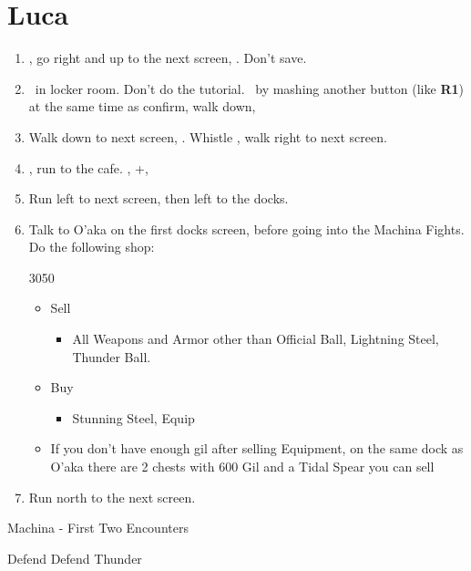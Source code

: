 \chapter{Luca}

\begin{enumerate}
    \item \sd, go right and up to the next screen, \cs[2:30]. Don't save.
    \item \sd\ in locker room. Don't do the tutorial. \sd\ by mashing another button (like \textbf{R1}) at the same time as confirm, walk down, \sd
    \item Walk down to next screen, \sd. Whistle \cs[0:30], walk right to next screen.
    \item \sd, run to the cafe. \sd, \skippablefmv+\cs[1:20], \sd
    \item Run left to next screen, then left to the docks.
    \item Talk to O'aka on the first docks screen, before going into the Machina Fights. Do the following shop:
    \begin{shop}{3050}
        \begin{itemize}
            \item Sell
                  \begin{itemize}
                      \item All Weapons and Armor other than Official Ball, Lightning Steel, Thunder Ball.
                  \end{itemize}
            \item Buy
                  \begin{itemize}
                      \item Stunning Steel, Equip
                  \end{itemize}
            \item If you don't have enough gil after selling Equipment, on the same dock as O'aka there are 2 chests with 600 Gil and a Tidal Spear you can sell
        \end{itemize}
    \end{shop}
    \item Run north to the next screen.
\end{enumerate}
\begin{battle}{Machina - First Two Encounters}
        \begin{itemize}
            \tidusf Defend
            \kimahrif Defend
            \luluf Thunder
        \end{itemize}
\end{battle}
